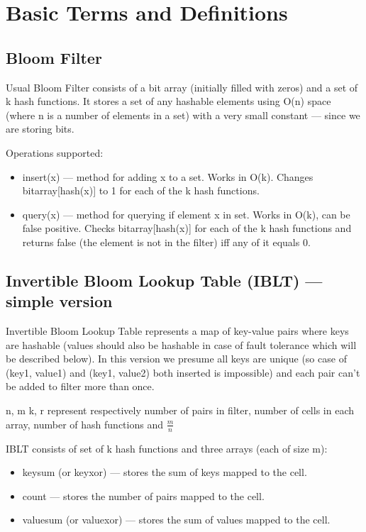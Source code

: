 \documentclass{article}
\begin{document}
\section{Basic Terms and Definitions}

\subsection{Bloom Filter}
Usual Bloom Filter consists of a bit array (initially filled with zeros) and a set of k hash functions.
It stores a set of any hashable elements using O(n) space (where n is a number of
elements in a set) with a very small constant --- since we are storing bits.

Operations supported:
\begin{itemize}
    \item insert(x) --- method for adding x to a set. Works in O(k). Changes bitarray[hash(x)] to 1 for each of the k hash functions.
    \item query(x) --- method for querying if element x in set. Works in O(k), can be false positive. Checks bitarray[hash(x)] for each of the k hash functions and returns false (the element is not in the filter) iff any of it equals 0.
\end{itemize}

\subsection{Invertible Bloom Lookup Table (IBLT) --- simple version}
Invertible Bloom Lookup Table represents a map of key-value pairs where keys are
hashable (values should also be hashable in case of fault tolerance which will 
be described below). In this version we presume all keys are unique (so case of 
(key1, value1) and (key1, value2) both inserted is impossible) and each pair 
can't be added to filter more than once.

n, m k, r represent respectively number of pairs in filter, number of cells in
each array, number of hash functions and $\frac{m}{n}$

IBLT consists of set of k hash functions and three arrays (each of size m):
\begin{itemize}
    \item keysum (or keyxor) --- stores the sum of keys mapped to the cell.
    \item count --- stores the number of pairs mapped to the cell.
    \item valuesum (or valuexor) --- stores the sum of values mapped to the cell.
\end{itemize}
\end{document}
